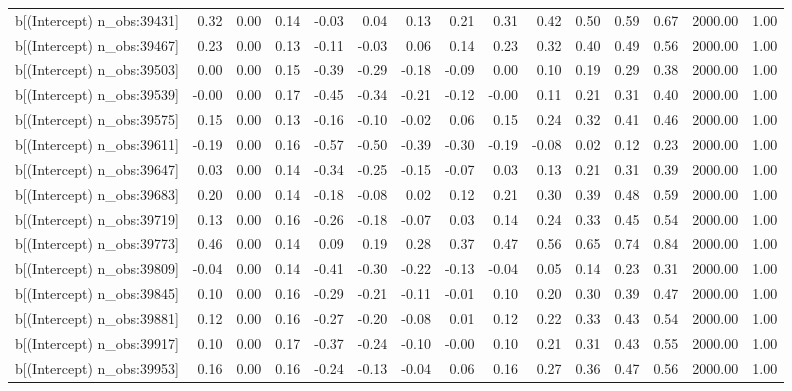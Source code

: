 \begin{table}[ht]
\begin{tabular}{rrrrrrrrrrrrrrr}
  b[(Intercept) n\_obs:39431] & 0.32 & 0.00 & 0.14 & -0.03 & 0.04 & 0.13 & 0.21 & 0.31 & 0.42 & 0.50 & 0.59 & 0.67 & 2000.00 & 1.00 \\ 
  b[(Intercept) n\_obs:39467] & 0.23 & 0.00 & 0.13 & -0.11 & -0.03 & 0.06 & 0.14 & 0.23 & 0.32 & 0.40 & 0.49 & 0.56 & 2000.00 & 1.00 \\ 
  b[(Intercept) n\_obs:39503] & 0.00 & 0.00 & 0.15 & -0.39 & -0.29 & -0.18 & -0.09 & 0.00 & 0.10 & 0.19 & 0.29 & 0.38 & 2000.00 & 1.00 \\ 
  b[(Intercept) n\_obs:39539] & -0.00 & 0.00 & 0.17 & -0.45 & -0.34 & -0.21 & -0.12 & -0.00 & 0.11 & 0.21 & 0.31 & 0.40 & 2000.00 & 1.00 \\ 
  b[(Intercept) n\_obs:39575] & 0.15 & 0.00 & 0.13 & -0.16 & -0.10 & -0.02 & 0.06 & 0.15 & 0.24 & 0.32 & 0.41 & 0.46 & 2000.00 & 1.00 \\ 
  b[(Intercept) n\_obs:39611] & -0.19 & 0.00 & 0.16 & -0.57 & -0.50 & -0.39 & -0.30 & -0.19 & -0.08 & 0.02 & 0.12 & 0.23 & 2000.00 & 1.00 \\ 
  b[(Intercept) n\_obs:39647] & 0.03 & 0.00 & 0.14 & -0.34 & -0.25 & -0.15 & -0.07 & 0.03 & 0.13 & 0.21 & 0.31 & 0.39 & 2000.00 & 1.00 \\ 
  b[(Intercept) n\_obs:39683] & 0.20 & 0.00 & 0.14 & -0.18 & -0.08 & 0.02 & 0.12 & 0.21 & 0.30 & 0.39 & 0.48 & 0.59 & 2000.00 & 1.00 \\ 
  b[(Intercept) n\_obs:39719] & 0.13 & 0.00 & 0.16 & -0.26 & -0.18 & -0.07 & 0.03 & 0.14 & 0.24 & 0.33 & 0.45 & 0.54 & 2000.00 & 1.00 \\ 
  b[(Intercept) n\_obs:39773] & 0.46 & 0.00 & 0.14 & 0.09 & 0.19 & 0.28 & 0.37 & 0.47 & 0.56 & 0.65 & 0.74 & 0.84 & 2000.00 & 1.00 \\ 
  b[(Intercept) n\_obs:39809] & -0.04 & 0.00 & 0.14 & -0.41 & -0.30 & -0.22 & -0.13 & -0.04 & 0.05 & 0.14 & 0.23 & 0.31 & 2000.00 & 1.00 \\ 
  b[(Intercept) n\_obs:39845] & 0.10 & 0.00 & 0.16 & -0.29 & -0.21 & -0.11 & -0.01 & 0.10 & 0.20 & 0.30 & 0.39 & 0.47 & 2000.00 & 1.00 \\ 
  b[(Intercept) n\_obs:39881] & 0.12 & 0.00 & 0.16 & -0.27 & -0.20 & -0.08 & 0.01 & 0.12 & 0.22 & 0.33 & 0.43 & 0.54 & 2000.00 & 1.00 \\ 
  b[(Intercept) n\_obs:39917] & 0.10 & 0.00 & 0.17 & -0.37 & -0.24 & -0.10 & -0.00 & 0.10 & 0.21 & 0.31 & 0.43 & 0.55 & 2000.00 & 1.00 \\ 
  b[(Intercept) n\_obs:39953] & 0.16 & 0.00 & 0.16 & -0.24 & -0.13 & -0.04 & 0.06 & 0.16 & 0.27 & 0.36 & 0.47 & 0.56 & 2000.00 & 1.00 \\ 

\end{tabular}
\end{table}
